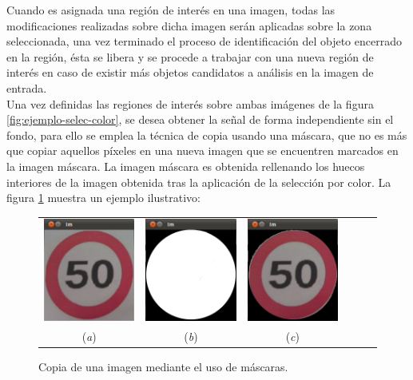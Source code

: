 Cuando es asignada una región de interés en una imagen, todas las modificaciones realizadas sobre dicha imagen serán aplicadas sobre la zona seleccionada, una vez terminado el proceso de identificación del objeto encerrado en la región, ésta se libera y se procede a trabajar con una nueva región de interés en caso de existir más objetos candidatos a análisis en la imagen de entrada.\\

Una vez definidas las regiones de interés sobre ambas imágenes de la figura \ref{fig:ejemplo-selec-color}, se desea obtener la señal de forma independiente sin el fondo, para ello se emplea la técnica de copia usando una máscara, que no es más que copiar aquellos píxeles en una nueva imagen que se encuentren marcados en la imagen máscara. La imagen máscara es obtenida rellenando los huecos interiores de la imagen obtenida tras la aplicación de la selección por color. La figura \ref{fig:mascaras} muestra un ejemplo ilustrativo:\\

\begin{figure}[H]
  \begin{center}
      \begin{tabular}{ccc p{3cm}p{3cm}p{3cm}}
        \includegraphics[width=3cm]{./imagenes/mascara/mascara1.png} &  \includegraphics[width=3cm]{./imagenes/mascara/mascara2.png} & \includegraphics[width=3cm]{./imagenes/mascara/mascara3.png} \\
        {(\emph{a})} & {(\emph{b})} & {(\emph{c})} \\
      \end{tabular}
    \caption{Copia de una imagen mediante el uso de máscaras.}
    \label{fig:mascaras}
  \end{center}
\end{figure}

